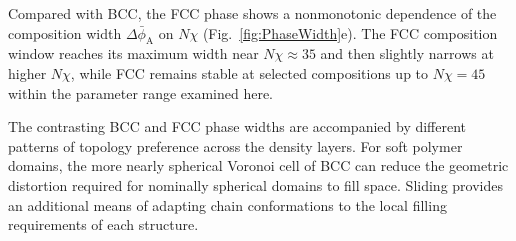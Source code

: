 Compared with BCC, the FCC phase shows a nonmonotonic dependence of the composition width $\Delta\bar{\phi}_{\mathrm A}$ on $N\chi$ (Fig.~\ref{fig:PhaseWidth}e).
The FCC composition window reaches its maximum width near $N\chi\approx35$ and then slightly narrows at higher $N\chi$, while FCC remains stable at selected compositions up to $N\chi=45$ within the parameter range examined here. 


The contrasting BCC and FCC phase widths are accompanied by different patterns of topology preference across the density layers.
For soft polymer domains, the more nearly spherical Voronoi cell of BCC can reduce the geometric distortion required for nominally spherical domains to fill space.
Sliding provides an additional means of adapting chain conformations to the local filling requirements of each structure.


